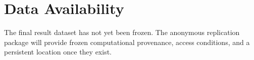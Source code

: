 \section{Data Availability}

The final result dataset has not yet been frozen. The anonymous replication
package will provide frozen computational provenance, access conditions, and a
persistent location once they exist.
